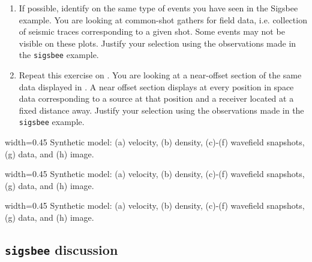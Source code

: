 \begin{enumerate}
\item If possible, identify on  the same type of events
  you have seen in the Sigsbee example. You are looking at common-shot
  gathers for field data, i.e. collection of seismic traces
  corresponding to a given shot. Some events may not be visible on
  these plots. Justify your selection using the observations made in
  the \texttt{sigsbee} example.
\item Repeat this exercise on . You are looking at a
  near-offset section of the same data displayed in . A
  near offset section displays at every position in space data
  corresponding to a source at that position and a receiver located at
  a fixed distance away. Justify your selection using the observations
  made in the \texttt{sigsbee} example.
\end{enumerate}


{width=0.45\textwidth} {Synthetic model: (a) velocity, (b) density,
  (c)-(f) wavefield snapshots, (g) data, and (h) image.}

{width=0.45\textwidth} {Synthetic model: (a) velocity, (b) density,
  (c)-(f) wavefield snapshots, (g) data, and (h) image.}

{width=0.45\textwidth} {Synthetic model: (a) velocity, (b) density,
  (c)-(f) wavefield snapshots, (g) data, and (h) image.}


\newpage
\subsection{\texttt{sigsbee} discussion}

